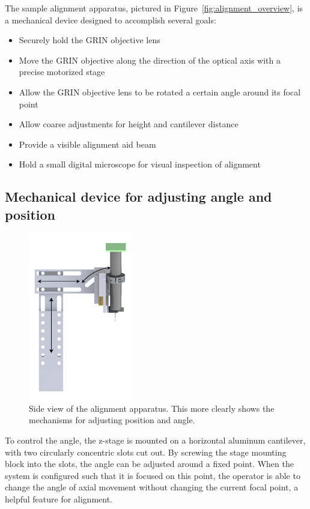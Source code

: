 The sample alignment apparatus, pictured in Figure~\ref{fig:alignment_overview}, is a mechanical device designed to accomplish several goals:

\begin{itemize}
	\item Securely hold the GRIN objective lens
	\item Move the GRIN objective along the direction of the optical axis with a precise motorized stage
	\item Allow the GRIN objective lens to be rotated a certain angle around its focal point
	\item Allow coarse adjustments for height and cantilever distance
	\item Provide a visible alignment aid beam
	\item Hold a small digital microscope for visual inspection of alignment
\end{itemize}

\subsection{Mechanical device for adjusting angle and position}

\begin{figure}[h!]
\centering
\includegraphics[width=0.4\textwidth]{Images/System/angle_a.png}
\caption[Side view of the alignment apparatus.]{Side view of the alignment apparatus. This more clearly shows the mechanisms for adjusting position and angle.}
\end{figure}

To control the angle, the z-stage is mounted on a horizontal aluminum cantilever, with two circularly concentric slots cut out. By screwing the stage mounting block into the slots, the angle can be adjusted around a fixed point. When the system is configured such that it is focused on this point, the operator is able to change the angle of axial movement without changing the current focal point, a helpful feature for alignment.

